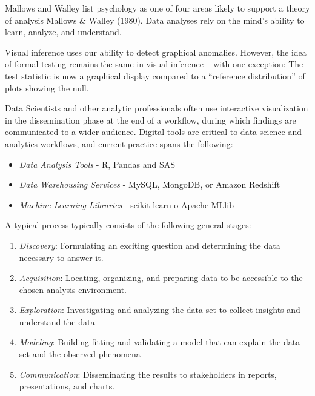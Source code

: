 \documentclass[print]{nuthesis}
\providecommand{\tightlist}{%
  \setlength{\itemsep}{0pt}\setlength{\parskip}{0pt}}
\begin{document}

Mallows and Walley list psychology as one of four areas likely to support a theory of analysis Mallows \& Walley (1980).
Data analyses rely on the mind's ability to learn, analyze, and understand.

Visual inference uses our ability to detect graphical anomalies.
However, the idea of formal testing remains the same in visual inference -- with one exception: The test statistic is now a graphical display compared to a ``reference distribution'' of plots showing the null.

Data Scientists and other analytic professionals often use interactive visualization in the dissemination phase at the end of a workflow, during which findings are communicated to a wider audience.
Digital tools are critical to data science and analytics workflows, and current practice spans the following:

\begin{itemize}
\tightlist
\item
  \emph{Data Analysis Tools} - R, Pandas and SAS
\item
  \emph{Data Warehousing Services} - MySQL, MongoDB, or Amazon Redshift
\item
  \emph{Machine Learning Libraries} - scikit-learn o Apache MLlib
\end{itemize}

A typical process typically consists of the following general stages:

\begin{enumerate}
\def\labelenumi{\arabic{enumi}.}
\tightlist
\item
  \emph{Discovery}: Formulating an exciting question and determining the data necessary to answer it.
\item
  \emph{Acquisition}: Locating, organizing, and preparing data to be accessible to the chosen analysis environment.
\item
  \emph{Exploration}: Investigating and analyzing the data set to collect insights and understand the data
\item
  \emph{Modeling}: Building fitting and validating a model that can explain the data set and the observed phenomena
\item
  \emph{Communication}: Disseminating the results to stakeholders in reports, presentations, and charts.
\end{enumerate}
\end{document}
